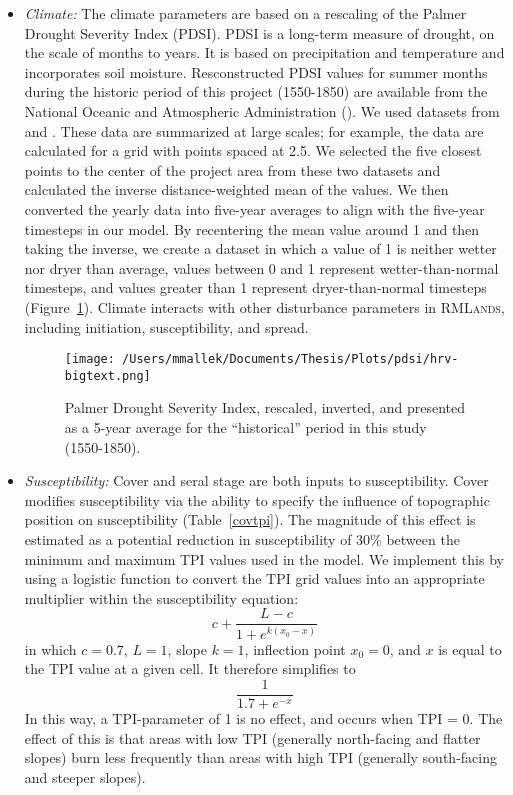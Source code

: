 \begin{itemize}
\item \emph{Climate:} The climate parameters are based on a rescaling of the Palmer Drought Severity Index (PDSI). PDSI is a long-term measure of drought, on the scale of months to years. It is based on precipitation and temperature and incorporates soil moisture. Resconstructed PDSI values for summer months during the historic period of this project (1550-1850) are available from the National Oceanic and Atmospheric Administration (). We used datasets from \citet{Zhangetal.2004} and \citet{Cook2004}. These data are summarized at large scales; for example, the \citet{Cook2004} data are calculated for a grid with points spaced at 2.5\textdegree. We selected the five closest points to the center of the project area from these two datasets and calculated the inverse distance-weighted mean of the values. We then converted the yearly data into five-year averages to align with the five-year timesteps in our model. By recentering the mean value around 1 and then taking the inverse, we create a dataset in which a value of 1 is neither wetter nor dryer than average, values between 0 and 1 represent wetter-than-normal timesteps, and values greater than 1 represent dryer-than-normal timesteps (Figure~\ref{pdsi}). Climate interacts with other disturbance parameters in \textsc{RMLands}, including initiation, susceptibility, and spread.

\begin{figure}[htbp]
\centering
\texttt{[image: /Users/mmallek/Documents/Thesis/Plots/pdsi/hrv-bigtext.png]}
\caption{Palmer Drought Severity Index, rescaled, inverted, and presented as a 5-year average for the ``historical'' period in this study (1550-1850).} 
\label{pdsi}
\end{figure}


\item \emph{Susceptibility:} Cover and seral stage are both inputs to susceptibility. Cover modifies susceptibility via the ability to specify the influence of topographic position on susceptibility (Table~\ref{covtpi}). The magnitude of this effect is estimated as a potential reduction in susceptibility of 30\% between the minimum and maximum TPI values used in the model. We implement this by using a logistic function to convert the TPI grid values into an appropriate multiplier within the susceptibility equation:
$$c + \frac{L-c}{1+e^{k(x_0-x)}}$$
in which $c= 0.7$, $L=1$, slope $k=1$, inflection point $x_0=0$, and $x$ is equal to the TPI value at a given cell. It therefore simplifies to 
$$\frac{1}{1.7+e^{-x}}$$
In this way, a TPI-parameter of 1 is no effect, and occurs when TPI = 0. The effect of this is that areas with low TPI (generally north-facing and flatter slopes) burn less frequently than areas with high TPI (generally south-facing and steeper slopes).



\end{itemize}
